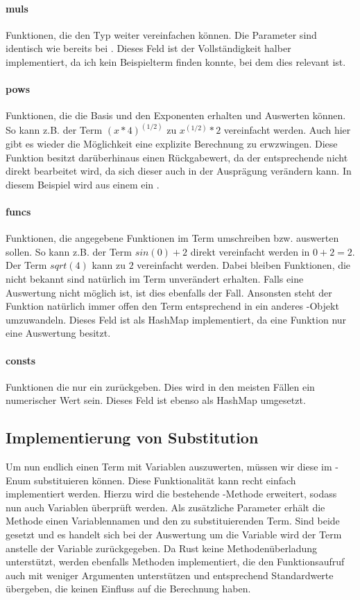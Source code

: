 \documentclass[11pt,a4paper, ngerman]{article}
\begin{document}
\paragraph{muls} Funktionen, die den Typ  weiter vereinfachen können. Die Parameter sind identisch wie bereits bei . Dieses Feld ist der Vollständigkeit halber implementiert, da ich kein Beispielterm finden konnte, bei dem dies relevant ist.

\paragraph{pows} Funktionen, die die Basis und den Exponenten erhalten und Auswerten können. So kann z.B. der Term $(x*4)^{(1/2)}$ zu $x^{(1/2)}*2$ vereinfacht werden. Auch hier gibt es wieder die Möglichkeit eine explizite Berechnung zu erwzwingen. Diese Funktion besitzt darüberhinaus einen Rückgabewert, da der entsprechende  nicht direkt bearbeitet wird, da sich dieser auch in der Ausprägung verändern kann. In diesem Beispiel wird aus einem  ein .

\paragraph{funcs} Funktionen, die angegebene Funktionen im Term umschreiben bzw. auswerten sollen. So kann z.B. der Term $sin(0) + 2$ direkt vereinfacht werden in $0 + 2 = 2$. Der Term $sqrt(4)$ kann zu $2$ vereinfacht werden. Dabei bleiben Funktionen, die  nicht bekannt sind natürlich im Term unverändert erhalten. Falls eine Auswertung nicht möglich ist, ist dies ebenfalls der Fall. Ansonsten steht der Funktion natürlich immer offen den Term entsprechend in ein anderes -Objekt umzuwandeln. Dieses Feld ist als HashMap implementiert, da eine Funktion nur eine Auswertung besitzt.

\paragraph{consts} Funktionen die nur ein  zurückgeben. Dies wird in den meisten Fällen ein numerischer Wert sein. Dieses Feld ist ebenso als HashMap umgesetzt.

\subsection{Implementierung von Substitution} Um nun endlich einen Term mit Variablen auszuwerten, müssen wir diese im -Enum substituieren können. Diese Funktionalität kann recht einfach implementiert werden. Hierzu wird die bestehende -Methode erweitert, sodass nun auch Variablen überprüft werden. Als zusätzliche Parameter erhält die Methode einen Variablennamen und den zu substituierenden Term. Sind beide gesetzt und es handelt sich bei der Auswertung um die Variable wird der Term anstelle der Variable zurückgegeben. Da Rust keine Methodenüberladung unterstützt, werden ebenfalls Methoden implementiert, die den Funktionsaufruf auch mit weniger Argumenten unterstützen und entsprechend Standardwerte übergeben, die keinen Einfluss auf die Berechnung haben.
\end{document}
